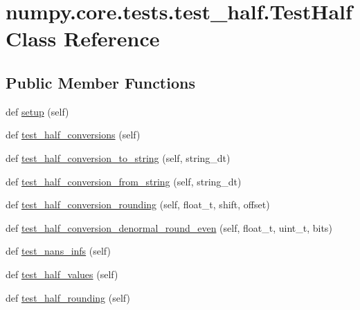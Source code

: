 \hypertarget{classnumpy_1_1core_1_1tests_1_1test__half_1_1TestHalf}{}\section{numpy.\+core.\+tests.\+test\+\_\+half.\+Test\+Half Class Reference}
\label{classnumpy_1_1core_1_1tests_1_1test__half_1_1TestHalf}
\subsection*{Public Member Functions}
\begin{DoxyCompactItemize}
\item 
def \hyperlink{classnumpy_1_1core_1_1tests_1_1test__half_1_1TestHalf_af2a3e89409f251859a6949caeb388fab}{setup} (self)
\item 
def \hyperlink{classnumpy_1_1core_1_1tests_1_1test__half_1_1TestHalf_aa5dacefc8b1105d314a55270572b4f15}{test\+\_\+half\+\_\+conversions} (self)
\item 
def \hyperlink{classnumpy_1_1core_1_1tests_1_1test__half_1_1TestHalf_a8810e3d5031725d94829c82b9a95e398}{test\+\_\+half\+\_\+conversion\+\_\+to\+\_\+string} (self, string\+\_\+dt)
\item 
def \hyperlink{classnumpy_1_1core_1_1tests_1_1test__half_1_1TestHalf_af570b9addcfe35fb6945dcecd5d62e97}{test\+\_\+half\+\_\+conversion\+\_\+from\+\_\+string} (self, string\+\_\+dt)
\item 
def \hyperlink{classnumpy_1_1core_1_1tests_1_1test__half_1_1TestHalf_a669e4993646f51024336faf242c505bd}{test\+\_\+half\+\_\+conversion\+\_\+rounding} (self, float\+\_\+t, shift, offset)
\item 
def \hyperlink{classnumpy_1_1core_1_1tests_1_1test__half_1_1TestHalf_a4f5c85102ac9a09bac2a863550180cee}{test\+\_\+half\+\_\+conversion\+\_\+denormal\+\_\+round\+\_\+even} (self, float\+\_\+t, uint\+\_\+t, bits)
\item 
def \hyperlink{classnumpy_1_1core_1_1tests_1_1test__half_1_1TestHalf_a066c5d8a7bac6c04535c609309eda974}{test\+\_\+nans\+\_\+infs} (self)
\item 
def \hyperlink{classnumpy_1_1core_1_1tests_1_1test__half_1_1TestHalf_a8a3eb1cc831a128c6ed35127f099f352}{test\+\_\+half\+\_\+values} (self)
\item 
def \hyperlink{classnumpy_1_1core_1_1tests_1_1test__half_1_1TestHalf_a430cae7bf7954b7408cd4bb7f39a3671}{test\+\_\+half\+\_\+rounding} (self)

\end{DoxyCompactItemize}
